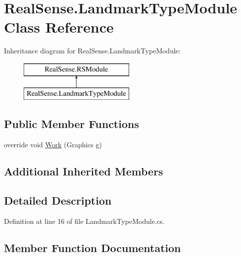 \hypertarget{class_real_sense_1_1_landmark_type_module}{}\section{Real\+Sense.\+Landmark\+Type\+Module Class Reference}
\label{class_real_sense_1_1_landmark_type_module}
Inheritance diagram for Real\+Sense.\+Landmark\+Type\+Module\+:\begin{figure}[H]
\begin{center}
\leavevmode
\includegraphics[height=2.000000cm]{class_real_sense_1_1_landmark_type_module}
\end{center}
\end{figure}
\subsection*{Public Member Functions}
\begin{DoxyCompactItemize}
\item 
override void \hyperlink{class_real_sense_1_1_landmark_type_module_ad110598b840e5496c1539862c4c53bc7}{Work} (Graphics g)
\end{DoxyCompactItemize}
\subsection*{Additional Inherited Members}


\subsection{Detailed Description}


Definition at line 16 of file Landmark\+Type\+Module.\+cs.



\subsection{Member Function Documentation}
\mbox{\label{class_real_sense_1_1_landmark_type_module_ad110598b840e5496c1539862c4c53bc7}} 
